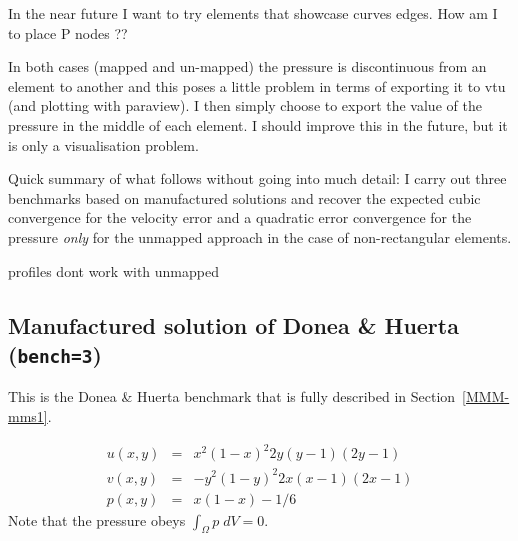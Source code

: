 In the near future I want to try elements that 
showcase curves edges. How am I to place P nodes ??

In both cases (mapped and un-mapped) the pressure is discontinuous from an element to another 
and this poses a little problem in terms of exporting it to 
vtu (and plotting with paraview). 
I then simply choose to export the value of the pressure in the middle of 
each element. {\color{red} I should improve this in the future, but it is 
only a visualisation problem.}


Quick summary of what follows without going into 
much detail: I carry out three benchmarks based on manufactured solutions  
and recover the expected cubic convergence for the velocity error 
and a quadratic error convergence for the pressure 
\textit{only} for the unmapped approach
in the case of non-rectangular elements.


profiles dont work with unmapped


\newpage
\subsection*{Manufactured solution of Donea \& Huerta ({\tt bench=3})}

This is the Donea \& Huerta benchmark that is fully described in Section~\ref{MMM-mms1}.

\begin{eqnarray}
u(x,y) &=& x^2(1-x)^2 2y (y-1)(2y-1) \nonumber\\
v(x,y) &=& -y^2 (1 - y)^2 2x (x-1)(2x-1) \nonumber\\
p(x,y) &=& x(1 -x)- 1/6 \nonumber 
\end{eqnarray}
Note that the pressure obeys $\int_{\Omega} p \; dV = 0$.


